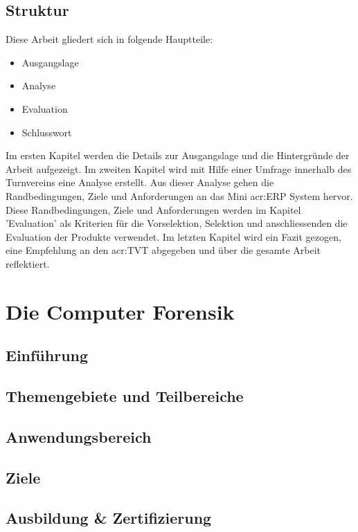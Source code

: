 \section{Struktur}
Diese Arbeit gliedert sich in folgende Hauptteile:
\begin{itemize}
\item Ausgangslage
\item Analyse
\item Evaluation
\item Schlusswort
\end{itemize}

Im ersten Kapitel werden die Details zur Ausgangslage und die Hintergründe der Arbeit aufgezeigt. Im zweiten Kapitel wird mit Hilfe einer Umfrage innerhalb des Turnvereins eine Analyse erstellt. Aus dieser Analyse gehen die Randbedingungen, Ziele und Anforderungen an das Mini \gls{acr:ERP} System hervor. Diese Randbedingungen, Ziele und Anforderungen werden im Kapitel 'Evaluation' als Kriterien für die Vorselektion, Selektion und anschliessenden die Evaluation der Produkte verwendet. Im letzten Kapitel wird ein Fazit gezogen, eine Empfehlung an den \gls{acr:TVT} abgegeben und über die gesamte Arbeit reflektiert.


\chapter{Die Computer Forensik}
\section{Einführung}

\section{Themengebiete und Teilbereiche}

\section{Anwendungsbereich}

\section{Ziele}

\section{Ausbildung \& Zertifizierung}

